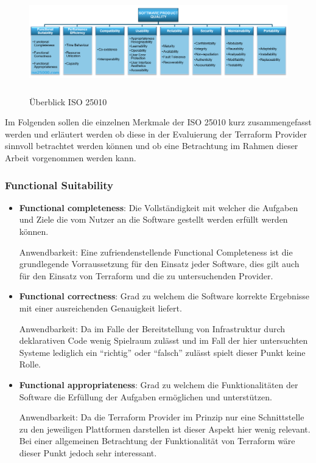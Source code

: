 \begin{figure}[H]
  \includegraphics[keepaspectratio, height=4.5cm]{fig/hauptteil/ISO25010.png}
  \caption{Überblick ISO 25010}
  \centering
\end{figure}

Im Folgenden sollen die einzelnen Merkmale der ISO 25010 kurz
zusammengefasst werden und erläutert werden ob diese in der Evaluierung
der Terraform Provider sinnvoll betrachtet werden können und ob eine
Betrachtung im Rahmen dieser Arbeit vorgenommen werden kann.

\subsubsection{Functional Suitability}

\begin{itemize}
  \item \textbf{Functional completeness}: Die Vollständigkeit mit welcher
  die Aufgaben und Ziele die vom Nutzer an die Software gestellt werden
  erfüllt werden können.

  Anwendbarkeit: Eine zufriendenstellende Functional Completeness ist die
  grundlegende Vorraussetzung für den Einsatz jeder Software, dies gilt
  auch für den Einsatz von Terraform und die zu untersuchenden Provider.

  \item \textbf{Functional correctness}: Grad zu welchem die Software
  korrekte Ergebnisse mit einer ausreichenden Genauigkeit liefert.

  Anwendbarkeit: Da im Falle der Bereitstellung von Infrastruktur durch
  deklarativen Code wenig Spielraum zulässt und im Fall der hier
  untersuchten Systeme lediglich ein \enquote{richtig} oder
  \enquote{falsch} zulässt spielt dieser Punkt keine Rolle.

  \item \textbf{Functional appropriateness}: Grad zu welchem die
  Funktionalitäten der Software die Erfüllung der Aufgaben ermöglichen
  und unterstützen.

  Anwendbarkeit: Da die Terraform Provider im Prinzip nur eine
  Schnittstelle zu den jeweiligen Plattformen darstellen ist dieser Aspekt
  hier wenig relevant. Bei einer allgemeinen Betrachtung der
  Funktionalität von Terraform wäre dieser Punkt jedoch sehr interessant.
\end{itemize}

